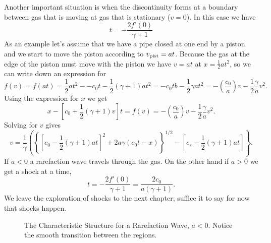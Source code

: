 {Another important situation is when the discontinuity forms at a
boundary between gas that is moving at gas that is stationary
($v=0$).  In this case we have
\begin{equation}
t = - \frac{2f'(0)}{\gamma+1}
\label{eq:696}
\end{equation}
As an example let's assume that we have a pipe closed at one end by a
piston and we start to move the piston according to $v_{\hbox{\rm \scriptsize pist}}=a
t$.  Because the gas at the edge of the piston must move with the
piston we have $v=at$ at $x=\frac{1}{2} at^2$, so we can write down an
expression for 
\begin{equation}
f(v) = f(at) = \frac{1}{2} at^2 - -c_0 t - \frac{1}{2} (\gamma + 1)
at^2 = -c_0 tb - \frac{1}{2} \gamma at^2 = -\left (\frac{c_0}{a} \right
) v - \frac{1}{2} \frac{\gamma}{a} v^2.
\label{eq:697}
\end{equation}
Using the expression for $x$ we get
\begin{equation}
x - \left [ c_0 + \frac{1}{2} (\gamma+1) v \right ] t = f(v) = -\left (\frac{c_0}{a} \right
) v - \frac{1}{2} \frac{\gamma}{a} v^2.
\label{eq:698}
\end{equation}
Solving for $v$ gives
\begin{equation}
v = \frac{1}{\gamma} \left ( \left \{ \left [ c_0 - \frac{1}{2}
  (\gamma+1) a t \right ]^2 + 2 a \gamma (c_0 t -x ) \right \}^{1/2} -
\left [ c_s - \frac{1}{2} (\gamma + 1 ) a t \right ] \right \}.
\label{eq:699}
\end{equation}
If $a<0$ a rarefaction wave travels through the gas.  On the other
hand if $a>0$ we get a shock at a time,
\begin{equation}
t = - \frac{2 f'(0)}{\gamma+1} = \frac{2 c_0}{a(\gamma+1)}.
\label{eq:700}
\end{equation}
We leave the exploration of shocks to the next chapter; suffice it to
say for now that shocks happen.

\begin{figure}
\begin{center}
\end{center}
\caption{The Characteristic Structure for a Rarefaction Wave,
  $a<0$. Notice the smooth transition between the regions.}
\end{figure}

}

